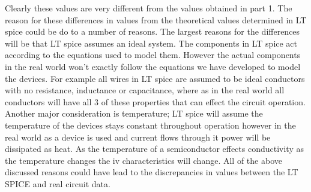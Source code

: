 \documentclass[titlepage, 12pt]{article}
\begin{document}
    Clearly these values are very different from the values obtained in
    part 1. The reason for these differences in values from the
    theoretical values determined in LT spice could be do to a number of
    reasons. The largest reasons for the differences will be that LT
    spice assumes an ideal system. The components in LT spice act
    according to the equations used to model them. However the actual
    components in the real world won't exactly follow the equations we
    have developed to model the devices. For example all wires in LT
    spice are assumed to be ideal conductors with no resistance,
    inductance or capacitance, where as in the real world all conductors
    will have all 3 of these properties that can effect the circuit
    operation. Another major consideration is temperature; LT spice will
    assume the temperature of the devices stays constant throughout
    operation however in the real world as a device is used and current
    flows through it power will be dissipated as heat. As the
    temperature of a semiconductor effects conductivity as the
    temperature changes the iv characteristics will change. All of the
    above discussed reasons could have lead to the discrepancies in
    values between the LT SPICE and real circuit data.
\end{document}
